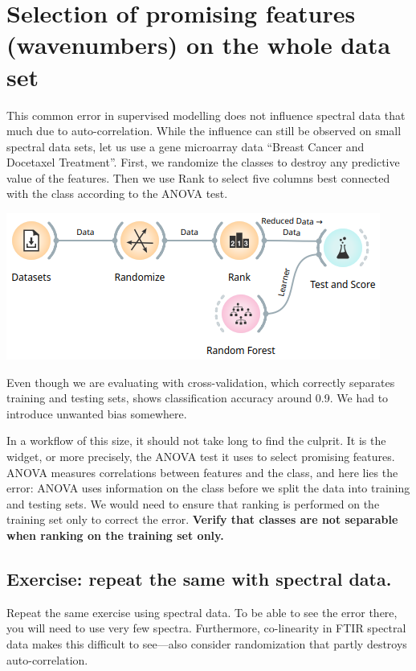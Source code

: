 \section{Selection of promising features (wavenumbers) on the whole data set}

This common error in supervised modelling does not influence spectral data that much due to auto-correlation. While the influence can still be observed on small spectral data sets, let us use a gene microarray data ``Breast Cancer and Docetaxel Treatment''. First, we randomize the classes to destroy any predictive value of the features. Then we use Rank to select five columns best connected with the class according to the ANOVA test.

\begin{center}
\includegraphics[scale=0.5]{column-selection.png}
\end{center}

Even though we are evaluating with cross-validation, which correctly separates training and testing sets,  shows classification accuracy around 0.9. We had to introduce unwanted bias somewhere.

In a workflow of this size, it should not take long to find the culprit. It is the  widget, or more precisely, the ANOVA test it uses to select promising features. ANOVA measures correlations between features and the class, and here lies the error: ANOVA uses information on the class before we split the data into training and testing sets. We would need to ensure that ranking is performed on the training set only to correct the error. \textbf{Verify that classes are not separable when ranking on the training set only.}


\subsection*{Exercise: repeat the same with spectral data.}

Repeat the same exercise using  spectral data. To be able to see the error there, you will need to use very few spectra. Furthermore, co-linearity in FTIR spectral data makes this difficult to see---also consider randomization that partly destroys auto-correlation.
